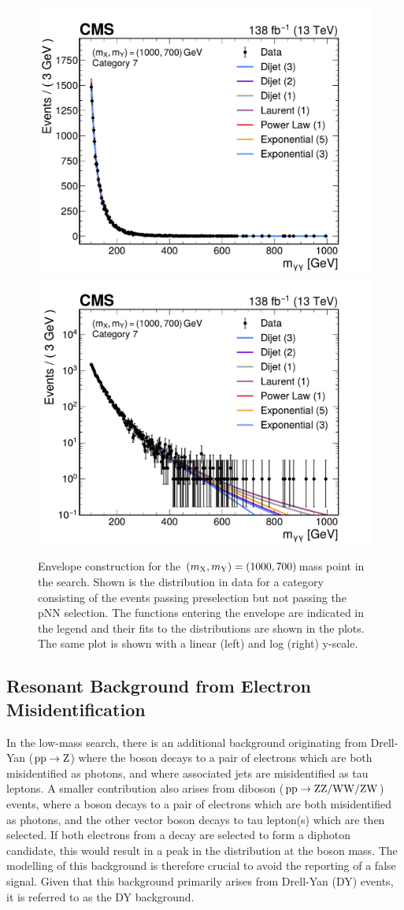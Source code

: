 \begin{figure}
  \centering
  \includegraphics[width=.49\linewidth]{Figures/Dihiggs/background/envelope/y_gg_high_mass/bkgmodel_pdfs_ggttresmx1000my700cat7.pdf}
  \includegraphics[width=.49\linewidth]{Figures/Dihiggs/background/envelope/y_gg_high_mass/bkgmodel_pdfs_ggttresmx1000my700cat7_log.pdf}
  \caption[Envelope Construction for $(\mX,\mY)=(1000,700)$\GeV in the \XYggHtt Search]{Envelope construction for the $(\mX,\mY)=(1000,700)$\GeV mass point in the \XYggHtt search. Shown is the \mgg distribution in data for a category consisting of the events passing preselection but not passing the pNN selection. The functions entering the envelope are indicated in the legend and their fits to the \mgg distributions are shown in the plots. The same plot is shown with a linear (left) and log (right) y-scale.}\label{fig:envelope_examples_ygg_high_cat7}
\end{figure}

\subsection{Resonant Background from Electron Misidentification}\label{sec:dy_bkg_modelling}
In the low-mass \XYggHtt search, there is an additional background originating from Drell-Yan ($\mathrm{p}\mathrm{p}\to\mathrm{Z}$) where the \PZ boson decays to a pair of electrons which are both misidentified as photons, and where associated jets are misidentified as tau leptons. A smaller contribution also arises from diboson ($\mathrm{p}\mathrm{p} \to \mathrm{Z}\mathrm{Z} / \mathrm{W}\mathrm{W} / \mathrm{Z}\mathrm{W}$) events, where a \PZ boson decays to a pair of electrons which are both misidentified as photons, and the other vector boson decays to tau lepton(s) which are then selected. If both electrons from a \Zee decay are selected to form a diphoton candidate, this would result in a peak in the \mgg distribution at the \PZ boson mass. The modelling of this background is therefore crucial to avoid the reporting of a false signal. Given that this background primarily arises from Drell-Yan (DY) events, it is referred to as the DY background.

